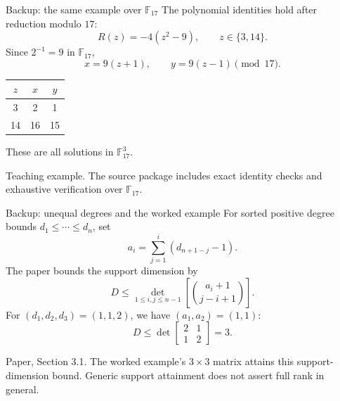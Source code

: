 \documentclass[aspectratio=169,11pt,professionalfonts]{beamer}
\newcommand{\src}[1]{\vfill{\color{Muted}\fontsize{7}{8.5}\selectfont #1\par}}
\begin{document}
\begin{frame}{Backup: the same example over $\mathbb F_{17}$}
The polynomial identities hold after reduction modulo $17$:
\[R(z)=-4(z^2-9),\qquad z\in\{3,14\}.\]
Since $2^{-1}=9$ in $\mathbb F_{17}$,
\[x=9(z+1),\qquad y=9(z-1)\pmod {17}.\]
\renewcommand{\arraystretch}{1.5}\begin{center}
\begin{tabular}{ccc}\toprule $z$&$x$&$y$\\\midrule 3&2&1\\14&16&15\\\bottomrule\end{tabular}
\end{center}
These are all solutions in $\mathbb F_{17}^3$.
\src{Teaching example. The source package includes exact identity checks and exhaustive verification over $\mathbb F_{17}$.}
\end{frame}

\begin{frame}{Backup: unequal degrees and the worked example}
For sorted positive degree bounds $d_1\le\cdots\le d_n$, set
\[a_i=\sum_{j=1}^{i}(d_{n+1-j}-1).\]
The paper bounds the support dimension by
\[D\le\det_{1\le i,j\le n-1}\left[\binom{a_i+1}{j-i+1}\right].\]
For $(d_1,d_2,d_3)=(1,1,2)$, we have $(a_1,a_2)=(1,1)$:
\[D\le\det\begin{bmatrix}2&1\\1&2\end{bmatrix}=3.\]
\src{Paper, Section 3.1. The worked example's $3\times3$ matrix attains this support-dimension bound. Generic support attainment does not assert full rank in general.}
\end{frame}
\end{document}
